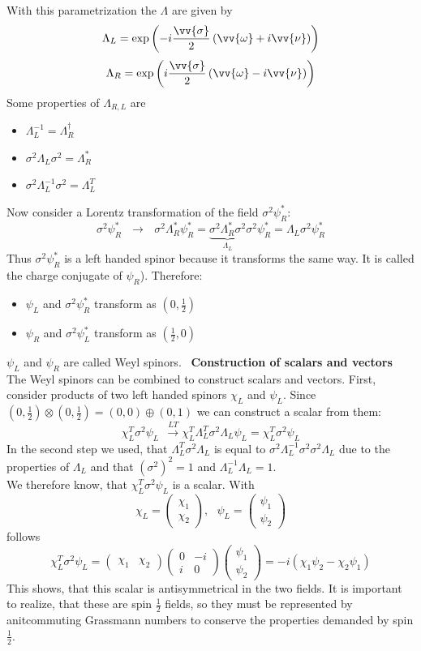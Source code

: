 \documentclass{include/thesisclass}
\newcommand{\df}{\rightarrow}
\newcommand{\vektorz}[2]{\begin{pmatrix} #1 \\ #2 \end{pmatrix}}
\newcommand{\Matz}[4]{\begin{pmatrix}#1&#2\\#3&#4\end{pmatrix}}
\newcommand{\sub}[1]{~\newline\newline\textbf{#1}\\}
\begin{document}
With this parametrization the $\Lambda$ are given by
\[ \Lambda_L = \exp\left( -i \frac{\vv{\sigma}}{2} \left(\vv{\omega} + i \vv{\nu}\right)\right)\]
\[ \Lambda_R = \exp\left( i \frac{\vv{\sigma}}{2} \left( \vv{\omega} - i \vv{\nu}\right)\right)\]
Some properties of $\Lambda_{R,L}$ are
\begin{itemize}
\item $\Lambda_L^{-1} = \Lambda_R^\dagger$
\item $\sigma^2 \Lambda_L \sigma^2 = \Lambda_R^*$
\item $\sigma^2 \Lambda_L^{-1} \sigma^2 = \Lambda_L^T$
\end{itemize}
Now consider a Lorentz transformation of the field $\sigma^2 \psi_R^*$:
\[ \sigma^2 \psi_R^* ~~~\df~~~ \sigma^2 \Lambda_R^*\psi_R^* = \underbrace{\sigma^2 \Lambda_R^*\sigma^2}_{\Lambda_L} \sigma^2 \psi_R^* = \Lambda_L \sigma^2 \psi_R^*\]
Thus $\sigma^2 \psi_R^*$ is a left handed spinor because it transforms the same way. It is called the charge conjugate of $\psi_R$). Therefore:
\begin{itemize}
\item $\psi_L$ and $\sigma^2\psi_R^*$ transform as $\left(0, \frac{1}{2}\right)$
\item $\psi_R$ and $\sigma^2\psi_L^*$ transform as $\left(\frac{1}{2}, 0\right)$
\end{itemize}
$\psi_L$ and $\psi_R$ are called Weyl spinors.
\sub{Construction of scalars and vectors}
The Weyl spinors can be combined to construct scalars and vectors. First, consider products of two left handed spinors $\chi_L$ and $\psi_L$. Since $\left( 0, \frac{1}{2}\right) \otimes \left( 0, \frac{1}{2}\right) = (0,0) \oplus (0,1)$ we can construct a scalar from them:
\[ \chi_L^T \sigma^2 \psi_L ~~\overset{LT}{\df} \chi_L^T \Lambda_L^T \sigma^2 \Lambda_L \psi_L = \chi_L^T \sigma^2 \psi_L\]
In the second step we used, that $\Lambda_L^T \sigma^2 \Lambda_L$ is equal to $\sigma^2 \Lambda_L^{-1}\sigma^2\sigma^2 \Lambda_L$ due to the properties of $\Lambda_{L}$ and that $(\sigma^2)^2= 1$ and $\Lambda_L^{-1}\Lambda_L = 1$. \\
We therefore know, that $\chi^T_L\sigma^2\psi_L$ is a scalar. With
\[ \chi_L = \vektorz{\chi_1}{\chi_2}, ~~~ \psi_L = \vektorz{\psi_1}{\psi_2}\]
follows
\[ \chi_L^T \sigma^2 \psi_L = \begin{pmatrix} \chi_1 & \chi_2\end{pmatrix} \Matz{0}{-i}{i}{0} \vektorz{\psi_1}{\psi_2} = - i (\chi_1 \psi_2 - \chi_2 \psi_1)\]
This shows, that this scalar is antisymmetrical in the two fields. It is important to realize, that these are spin $\frac{1}{2}$ fields, so they must be represented by anitcommuting Grassmann numbers to conserve the properties demanded by spin $\frac{1}{2}$.\\
\end{document}
